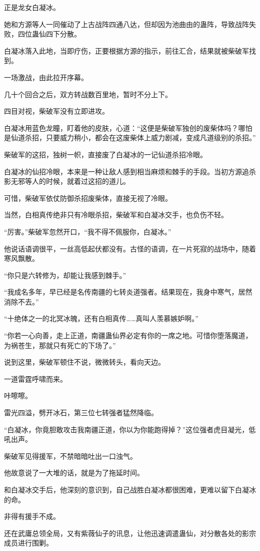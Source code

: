 \begin{this_body}
正是龙女白凝冰。

她和方源等人一同催动了上古战阵四通八达，但却因为池曲由的蛊阵，导致战阵失败，四位蛊仙四下分散。

白凝冰落入此地，当即疗伤，正要根据方源的指示，前往汇合，结果就被柴破军找到。

一场激战，由此拉开序幕。

几十个回合之后，双方转战数百里地，暂时不分上下。

四目对视，柴破军没有立即进攻。

白凝冰用蓝色龙瞳，盯着他的皮肤，心道：“这便是柴破军独创的废柴体吗？哪怕是仙道杀招，只要威力稍小，都会在这废柴体上威力剧减，变成凡道级别的杀招。”

柴破军的这招，独树一帜，直接废了白凝冰的一记仙道杀招冷眼。

白凝冰的仙招冷眼，本来是一种让敌人感到相当麻烦和棘手的手段。当初方源追杀影无邪等人的时候，就着过这招的道儿。

可惜，柴破军依仗防御杀招废柴体，直接无视了冷眼。

当然，白相真传绝非只有冷眼杀招，柴破军和白凝冰交手，也负伤不轻。

“厉害。”柴破军忽然开口，“我不得不佩服你，白凝冰。”

他说话语调很平，一丝高低起伏都没有。古怪的语调，在一片死寂的战场中，随着寒风飘散。

“你只是六转修为，却能让我感到棘手。”

“我成名多年，早已经是名传南疆的七转炎道强者。结果现在，我身中寒气，居然消除不去。”

“十绝体之一的北冥冰魄，还有白相真传……真叫人羡慕嫉妒啊。”

“你若一心向善，走上正道，南疆蛊仙界必定有你的一席之地。可惜你堕落魔道，为祸苍生，那就只有死亡的下场了。”

说到这里，柴破军顿住不说，微微转头，看向天边。

一道雷霆呼啸而来。

咔嚓嚓。

雷光四溢，劈开冰石，第三位七转强者猛然降临。

“白凝冰，你竟胆敢攻击我南疆正道，你以为你能跑得掉？”这位强者虎目凝光，低吼出声。

柴破军见得援军，不禁暗暗吐出一口浊气。

他故意说了一大堆的话，就是为了拖延时间。

和白凝冰交手后，他深刻的意识到，自己战胜白凝冰都很困难，更难以留下白凝冰的命。

非得有援手不成。

还在武庸总领全局，又有紫薇仙子的讯息，让他迅速调遣蛊仙，对分散各处的影宗成员进行围剿。


\end{this_body}
